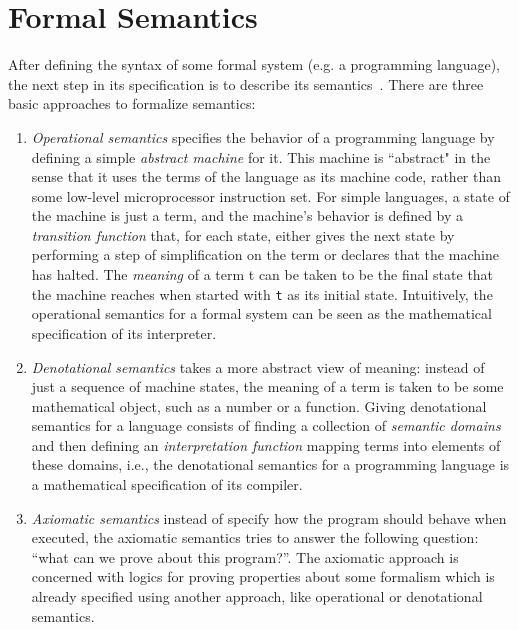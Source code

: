 \documentclass[oneside,12pt]{scrbook}
\theoremstyle{definition}
\theoremstyle{plain}
\theoremstyle{definition}
\begin{document}

\section{Formal Semantics}\label{section:formalsemantics}

After defining the syntax of some formal system (e.g. a programming language), the next step in its specification is to describe its semantics~\cite{Pierce2000}. There are three basic approaches to formalize semantics:

\begin{enumerate}
	\item \textit{Operational semantics} specifies the behavior of a programming language by defining a simple \textit{abstract machine}
	for it. This machine is ``abstract" in the sense that it uses the terms of the language as its machine code, rather than some low-level microprocessor instruction set. For simple languages, a state of the machine is just a term, and the machine’s behavior is defined by a \textit{transition function} that, for each state, either gives the next state by performing a step of
	simplification on the term or declares that the machine has halted. The \textit{meaning} of a term t can be taken to be the final state that the machine reaches when started with \texttt{t} as its initial state. Intuitively, the operational semantics for
	a formal system can be seen as the mathematical specification of its interpreter.
	\item \textit{Denotational semantics} takes a more abstract view of meaning: instead of just a sequence of machine states, the meaning
	of a term is taken to be some mathematical object, such as a number or a function. Giving denotational semantics for a language
	consists of finding a collection of \textit{semantic domains} and then defining an \textit{interpretation function} mapping terms
	into elements of these domains, i.e., the denotational semantics for a programming language is a mathematical specification of
	its compiler.
	\item \textit{Axiomatic semantics} instead of specify how the program should behave when executed, the axiomatic semantics
	tries to answer the following question: ``what can we prove about this program?''. The axiomatic approach is concerned with
	logics for proving properties about some formalism which is already specified using another approach, like operational or
	denotational semantics.
\end{enumerate}
\end{document}
